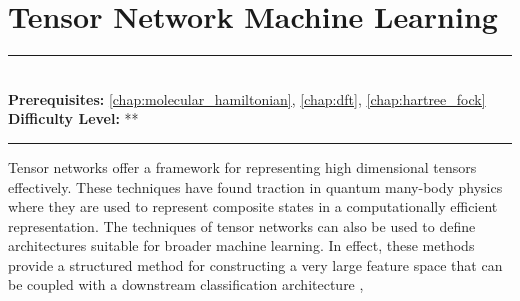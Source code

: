 \documentclass[book.tex]{subfiles}
\begin{document}
\chapter{Tensor Network Machine Learning}
\label{chap:quantum_rl}
\noindent\rule{11cm}{0.4pt} \\
\textbf{Prerequisites:} \autoref{chap:molecular_hamiltonian}, \autoref{chap:dft}, \autoref{chap:hartree_fock} \\
\textbf{Difficulty Level:} ** \\
\noindent\rule{11cm}{0.4pt}
\vspace{5mm}

Tensor networks offer a framework for representing high dimensional tensors effectively. These techniques have found traction in quantum many-body physics where they are used to represent composite states in a computationally efficient representation. The techniques of tensor networks can also be used to define architectures suitable for broader machine learning. In effect, these methods provide a structured method for constructing a very large feature space that can be coupled with a downstream classification architecture \cite{stoudenmire2016supervised}, \cite{convy2021mutual}


\end{document}
